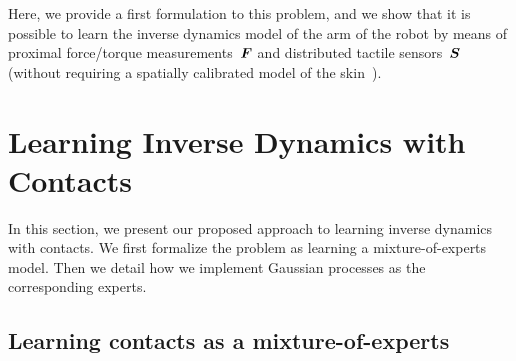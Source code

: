Here, we provide a first formulation to this problem, and we show that it is
possible to learn the inverse dynamics model of the arm of the \robot{} robot by
means of proximal force/torque measurements~$\boldsymbol{F}$ and distributed tactile
sensors~$\mathcal{\boldsymbol{S}}$ (without requiring a spatially calibrated model of the
skin~\cite{DelPrete2011}). 
    

\section{Learning Inverse Dynamics with Contacts}
\label{sec:mgp}

In this section, we present our proposed approach to learning inverse dynamics
with contacts. We first formalize the problem as learning a mixture-of-experts
model. Then we detail how we implement Gaussian processes as the corresponding
experts.

\subsection{Learning contacts as a mixture-of-experts}
		
